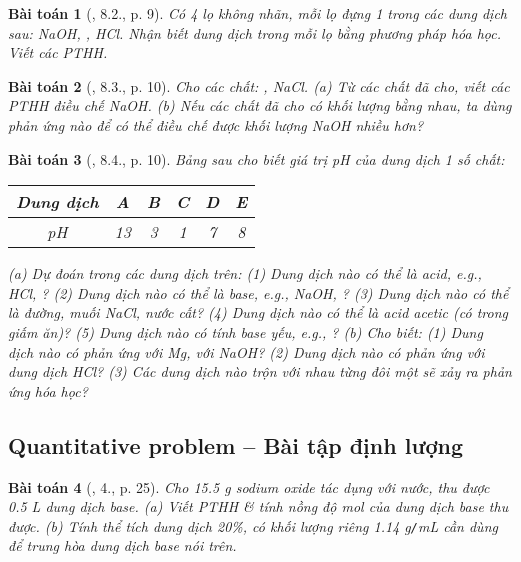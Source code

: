 \documentclass{article}
\newtheorem{baitoan}{Bài toán}
\begin{document}
\begin{baitoan}[\cite{SGK_Hoa_Hoc_9}, 8.2., p. 9]
	Có 4 lọ không nhãn, mỗi lọ đựng 1 trong các dung dịch sau: \emph{NaOH, , HCl}. Nhận biết dung dịch trong mỗi lọ bằng phương pháp hóa học. Viết các PTHH.
\end{baitoan}

\begin{baitoan}[\cite{SGK_Hoa_Hoc_9}, 8.3., p. 10]
	Cho các chất: \emph{, NaCl}. (a) Từ các chất đã cho, viết các PTHH điều chế \emph{NaOH}. (b) Nếu các chất đã cho có khối lượng bằng nhau, ta dùng phản ứng nào để có thể điều chế được khối lượng \emph{NaOH} nhiều hơn?
\end{baitoan}

\begin{baitoan}[\cite{SGK_Hoa_Hoc_9}, 8.4., p. 10]
	Bảng sau cho biết giá trị pH của dung dịch 1 số chất:
	\begin{table}[H]
		\centering
		\begin{tabular}{|c|c|c|c|c|c|}
			\hline
			Dung dịch & A & B & C & D & E \\
			\hline
			pH & 13 & 3 & 1 & 7 & 8 \\
			\hline
		\end{tabular}
	\end{table}
	\noindent(a) Dự đoán trong các dung dịch trên: (1) Dung dịch nào có thể là acid, e.g., \emph{HCl, }? (2) Dung dịch nào có thể là base, e.g., \emph{NaOH, }? (3) Dung dịch nào có thể là đường, muối \emph{NaCl}, nước cất? (4) Dung dịch nào có thể là acid acetic (có trong giấm ăn)? (5) Dung dịch nào có tính base yếu, e.g., \emph{}? (b) Cho biết: (1) Dung dịch nào có phản ứng với \emph{Mg}, với \emph{NaOH}? (2) Dung dịch nào có phản ứng với dung dịch \emph{HCl}? (3) Các dung dịch nào trộn với nhau từng đôi một sẽ xảy ra phản ứng hóa học?	
\end{baitoan}

\subsection{Quantitative problem -- Bài tập định lượng}

\begin{baitoan}[\cite{SGK_Hoa_Hoc_9}, 4., p. 25]
	Cho \emph{15.5 g} sodium oxide \emph{} tác dụng với nước, thu được \emph{0.5 L} dung dịch base. (a) Viết PTHH \& tính nồng độ mol của dung dịch base thu được. (b) Tính thể tích dung dịch \emph{ 20\%}, có khối lượng riêng \emph{1.14 g\texttt{/}mL} cần dùng để trung hòa dung dịch base nói trên.
\end{baitoan}
\end{document}
